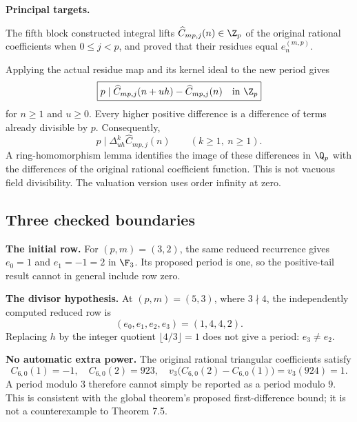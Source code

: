 \textbf{Principal targets.}\par
{}\par
{}\par
{}\par
{}

\par\medskip
{}
The fifth block constructed integral lifts $\widehat C_{mp,j}(n)\in\Z_p$ of the original rational coefficients when $0\le j<p$, and proved that their residues equal $e_n^{(m,p)}$.

Applying the actual residue map and its kernel ideal to the new period gives
\[
 \boxed{p\mid\widehat C_{mp,j}(n+uh)-\widehat C_{mp,j}(n)
       \quad\hbox{in }\Z_p}
\]
for $n\ge1$ and $u\ge0$. Every higher positive difference is a difference of terms already divisible by $p$. Consequently,
\[
 p\mid\Delta_{uh}^{k}\widehat C_{mp,j}(n)\qquad(k\ge1,\ n\ge1).
\]
A ring-homomorphism lemma identifies the image of these differences in $\Q_p$ with the differences of the original rational coefficient function. This is not vacuous field divisibility. The valuation version uses order infinity at zero.

\subsection*{Three checked boundaries}
\textbf{The initial row.} For $(p,m)=(3,2)$, the same reduced recurrence gives $e_0=1$ and $e_1=-1=2$ in $\F_3$. Its proposed period is one, so the positive-tail result cannot in general include row zero.

\textbf{The divisor hypothesis.} At $(p,m)=(5,3)$, where $3\nmid4$, the independently computed reduced row is
\[
 (e_0,e_1,e_2,e_3)=(1,4,4,2).
\]
Replacing $h$ by the integer quotient $\lfloor4/3\rfloor=1$ does not give a period: $e_3\ne e_2$.

\textbf{No automatic extra power.} The original rational triangular coefficients satisfy
\[
 C_{6,0}(1)=-1,\quad C_{6,0}(2)=923,\quad
 v_3\bigl(C_{6,0}(2)-C_{6,0}(1)\bigr)=v_3(924)=1.
\]
A period modulo $3$ therefore cannot simply be reported as a period modulo $9$. This is consistent with the global theorem's proposed first-difference bound; it is not a counterexample to Theorem 7.5.

